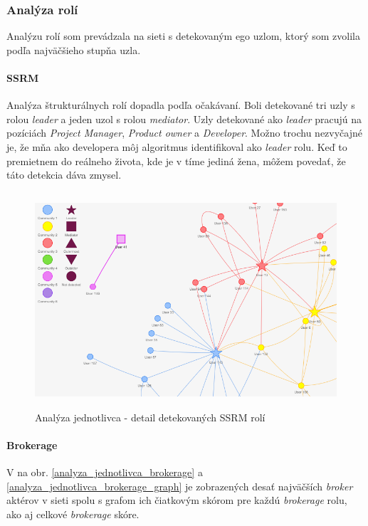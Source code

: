 \documentclass[slovak,master,public,dept460,male,cpdeclaration,oneside]{diploma}
\begin{document}
\subsubsection{Analýza rolí}
Analýzu rolí som prevádzala na sieti s detekovaným ego uzlom, ktorý som zvolila podľa najväčšieho stupňa uzla.

\paragraph{SSRM}
\hfill \break
Analýza štrukturálnych rolí dopadla podľa očakávaní. Boli detekované tri uzly s rolou \textit{leader} a jeden uzol s rolou \textit{mediator}. Uzly detekované ako \textit{leader} pracujú na pozíciách \textit{Project Manager}, \textit{Product owner} a \textit{Developer}. Možno trochu nezvyčajné je, že mňa ako developera môj algoritmus identifikoval ako  \textit{leader} rolu. Keď  to premietnem do reálneho života, kde je v tíme jediná žena, môžem povedať, že táto detekcia dáva zmysel.


\begin{figure}[H]
\centering
\includegraphics[width=12cm, height=8cm]{figures/analyza_jednotlivca_ssrm_detail}
\caption{Analýza jednotlivca - detail detekovaných SSRM rolí}
\end{figure}

\paragraph{Brokerage}
\hfill \break
V na obr. \ref{analyza_jednotlivca_brokerage} a \ref{analyza_jednotlivca_brokerage_graph} je zobrazených desať najväčších \textit{broker} aktérov v sieti spolu s grafom ich čiatkovým skórom pre každú \textit{brokerage} rolu, ako aj celkové \textit{brokerage} skóre.
\end{document}

